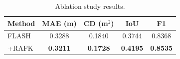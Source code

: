 \begin{table}[t]
\centering
\caption{Ablation study results.}
\label{tab:ablation}
\begin{tabular}{lcccc}
\toprule
Method & MAE (m) & CD (m$^2$) & IoU & F1 \\
\midrule
FLASH & 0.3288 & 0.1840 & 0.3744 & 0.8368 \\
+RAFK & \textbf{0.3211} & \textbf{0.1728} & \textbf{0.4195} & \textbf{0.8535} \\
\bottomrule
\end{tabular}
\end{table}